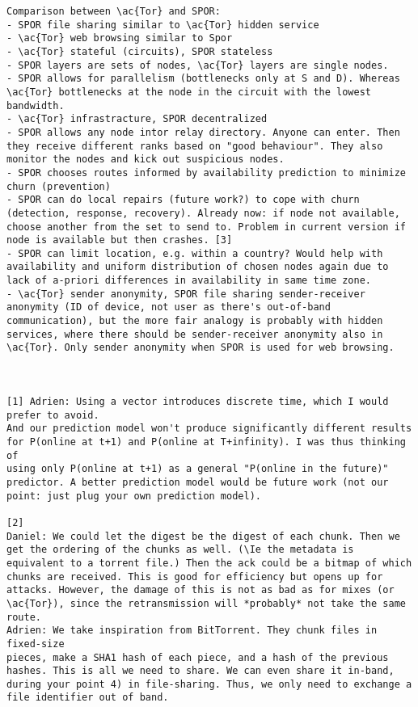 \begin{verbatim}
Comparison between \ac{Tor} and SPOR:
- SPOR file sharing similar to \ac{Tor} hidden service
- \ac{Tor} web browsing similar to Spor
- \ac{Tor} stateful (circuits), SPOR stateless
- SPOR layers are sets of nodes, \ac{Tor} layers are single nodes.
- SPOR allows for parallelism (bottlenecks only at S and D). Whereas \ac{Tor} bottlenecks at the node in the circuit with the lowest 
bandwidth.
- \ac{Tor} infrastracture, SPOR decentralized
- SPOR allows any node intor relay directory. Anyone can enter. Then they receive different ranks based on "good behaviour". They also monitor the nodes and kick out suspicious nodes.
- SPOR chooses routes informed by availability prediction to minimize churn (prevention)
- SPOR can do local repairs (future work?) to cope with churn (detection, response, recovery). Already now: if node not available, choose another from the set to send to. Problem in current version if node is available but then crashes. [3]
- SPOR can limit location, e.g. within a country? Would help with availability and uniform distribution of chosen nodes again due to lack of a-priori differences in availability in same time zone.
- \ac{Tor} sender anonymity, SPOR file sharing sender-receiver anonymity (ID of device, not user as there's out-of-band communication), but the more fair analogy is probably with hidden services, where there should be sender-receiver anonymity also in \ac{Tor}. Only sender anonymity when SPOR is used for web browsing.



[1] Adrien: Using a vector introduces discrete time, which I would prefer to avoid.
And our prediction model won't produce significantly different results
for P(online at t+1) and P(online at T+infinity). I was thus thinking of
using only P(online at t+1) as a general "P(online in the future)"
predictor. A better prediction model would be future work (not our
point: just plug your own prediction model).

[2]
Daniel: We could let the digest be the digest of each chunk. Then we get the ordering of the chunks as well. (\Ie the metadata is equivalent to a torrent file.) Then the ack could be a bitmap of which chunks are received. This is good for efficiency but opens up for attacks. However, the damage of this is not as bad as for mixes (or \ac{Tor}), since the retransmission will *probably* not take the same route.
Adrien: We take inspiration from BitTorrent. They chunk files in fixed-size
pieces, make a SHA1 hash of each piece, and a hash of the previous
hashes. This is all we need to share. We can even share it in-band,
during your point 4) in file-sharing. Thus, we only need to exchange a
file identifier out of band.


\end{verbatim}
